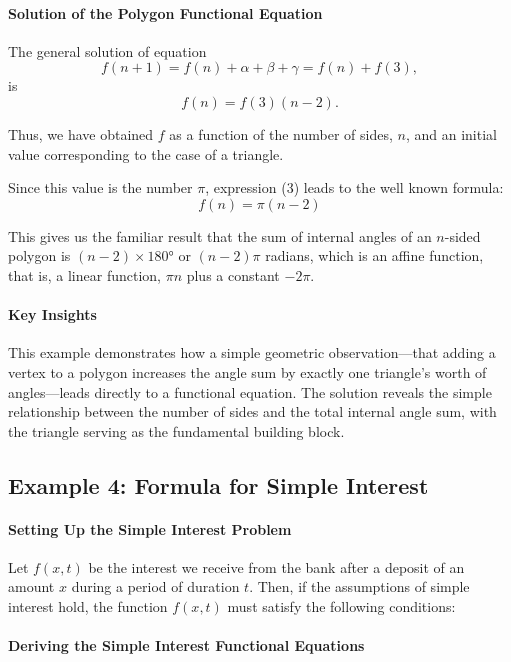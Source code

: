 \paragraph{Solution of the Polygon Functional Equation}
The general solution of equation
\begin{equation}
f(n + 1) = f(n) + \alpha + \beta + \gamma = f(n) + f(3),
\end{equation}
is
\begin{equation}
f(n) = f(3)(n - 2).
\end{equation}

Thus, we have obtained $f$ as a function of the number of sides, $n$, and an initial value corresponding to the case of a triangle.

Since this value is the number $\pi$, expression (3) leads to the well known formula:
\begin{equation}
\boxed{f(n) = \pi (n - 2)}
\end{equation}

This gives us the familiar result that the sum of internal angles of an $n$-sided polygon is $(n-2) \times 180°$ or $(n-2)\pi$ radians, which is an affine function, that is, a linear function, $\pi n$ plus a constant $-2\pi$.

\paragraph{Key Insights}
This example demonstrates how a simple geometric observation—that adding a vertex to a polygon increases the angle sum by exactly one triangle's worth of angles—leads directly to a functional equation. The solution reveals the simple relationship between the number of sides and the total internal angle sum, with the triangle serving as the fundamental building block.

\subsection{Example 4: Formula for Simple Interest}
\paragraph{Setting Up the Simple Interest Problem}
Let $f(x, t)$ be the interest we receive from the bank after a deposit of an amount $x$ during a period of duration $t$. Then, if the assumptions of simple interest hold, the function $f(x, t)$ must satisfy the following conditions:

\paragraph{Deriving the Simple Interest Functional Equations}
